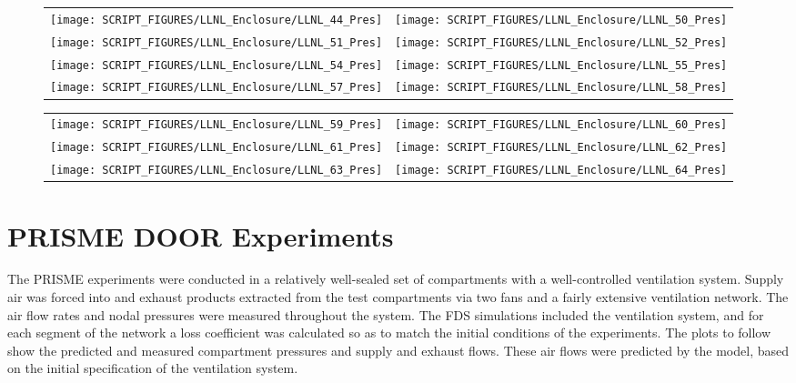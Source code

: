 \begin{figure}[p]
\begin{tabular*}{\textwidth}{l@{\extracolsep{\fill}}r}
\texttt{[image: SCRIPT\_FIGURES/LLNL\_Enclosure/LLNL\_44\_Pres]} &
\texttt{[image: SCRIPT\_FIGURES/LLNL\_Enclosure/LLNL\_50\_Pres]} \\
\texttt{[image: SCRIPT\_FIGURES/LLNL\_Enclosure/LLNL\_51\_Pres]} &
\texttt{[image: SCRIPT\_FIGURES/LLNL\_Enclosure/LLNL\_52\_Pres]} \\
\texttt{[image: SCRIPT\_FIGURES/LLNL\_Enclosure/LLNL\_54\_Pres]} &
\texttt{[image: SCRIPT\_FIGURES/LLNL\_Enclosure/LLNL\_55\_Pres]} \\
\texttt{[image: SCRIPT\_FIGURES/LLNL\_Enclosure/LLNL\_57\_Pres]} &
\texttt{[image: SCRIPT\_FIGURES/LLNL\_Enclosure/LLNL\_58\_Pres]}
\end{tabular*}
\label{LLNL_Enclosure_Pres_5}
\end{figure}

\begin{figure}[p]
\begin{tabular*}{\textwidth}{l@{\extracolsep{\fill}}r}
\texttt{[image: SCRIPT\_FIGURES/LLNL\_Enclosure/LLNL\_59\_Pres]} &
\texttt{[image: SCRIPT\_FIGURES/LLNL\_Enclosure/LLNL\_60\_Pres]} \\
\texttt{[image: SCRIPT\_FIGURES/LLNL\_Enclosure/LLNL\_61\_Pres]} &
\texttt{[image: SCRIPT\_FIGURES/LLNL\_Enclosure/LLNL\_62\_Pres]} \\
\texttt{[image: SCRIPT\_FIGURES/LLNL\_Enclosure/LLNL\_63\_Pres]} &
\texttt{[image: SCRIPT\_FIGURES/LLNL\_Enclosure/LLNL\_64\_Pres]}
\end{tabular*}
\label{LLNL_Enclosure_Pres_6}
\end{figure}


\clearpage

\section{PRISME DOOR Experiments}

The PRISME experiments were conducted in a relatively well-sealed set of compartments with a well-controlled ventilation system. Supply air was forced into and exhaust products extracted from the test compartments via two fans and a fairly extensive ventilation network. The air flow rates and nodal pressures were measured throughout the system. The FDS simulations included the ventilation system, and for each segment of the network a loss coefficient was calculated so as to match the initial conditions of the experiments. The plots to follow show the predicted and measured compartment pressures and supply and exhaust flows. These air flows were predicted by the model, based on the initial specification of the ventilation system. 

